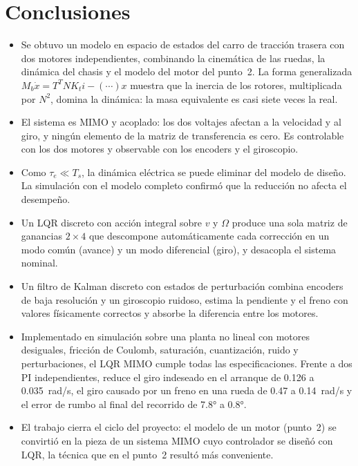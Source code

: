 \documentclass[11pt,letterpaper]{article}
\begin{document}
\section{Conclusiones}
\begin{itemize}
  \item Se obtuvo un modelo en espacio de estados del carro de tracción trasera con dos motores independientes, combinando la cinemática de las ruedas, la dinámica del chasis y el modelo del motor del punto~2. La forma generalizada $M_b\dot x = T^TNK_t i - (\cdots)x$ muestra que la inercia de los rotores, multiplicada por $N^2$, domina la dinámica: la masa equivalente es casi siete veces la real.
  \item El sistema es MIMO y acoplado: los dos voltajes afectan a la velocidad y al giro, y ningún elemento de la matriz de transferencia es cero. Es controlable con los dos motores y observable con los encoders y el giroscopio.
  \item Como $\tau_e \ll T_s$, la dinámica eléctrica se puede eliminar del modelo de diseño. La simulación con el modelo completo confirmó que la reducción no afecta el desempeño.
  \item Un LQR discreto con acción integral sobre $v$ y $\Omega$ produce una sola matriz de ganancias $2\times4$ que descompone automáticamente cada corrección en un modo común (avance) y un modo diferencial (giro), y desacopla el sistema nominal.
  \item Un filtro de Kalman discreto con estados de perturbación combina encoders de baja resolución y un giroscopio ruidoso, estima la pendiente y el freno con valores físicamente correctos y absorbe la diferencia entre los motores.
  \item Implementado en simulación sobre una planta no lineal con motores desiguales, fricción de Coulomb, saturación, cuantización, ruido y perturbaciones, el LQR MIMO cumple todas las especificaciones. Frente a dos PI independientes, reduce el giro indeseado en el arranque de 0.126 a 0.035~rad/s, el giro causado por un freno en una rueda de 0.47 a 0.14~rad/s y el error de rumbo al final del recorrido de 7.8° a 0.8°.
  \item El trabajo cierra el ciclo del proyecto: el modelo de un motor (punto~2) se convirtió en la pieza de un sistema MIMO cuyo controlador se diseñó con LQR, la técnica que en el punto~2 resultó más conveniente.
\end{itemize}
\end{document}
